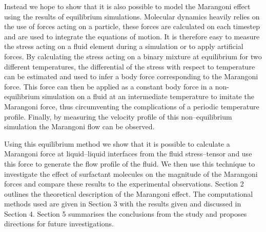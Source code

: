 Instead we hope to show that it is also possible to model the Marangoni effect using the results of equilibrium simulations. 
Molecular dynamics heavily relies on the use of forces acting on a particle, these forces are calculated on each timestep and are used to integrate the equations of motion.
It is therefore easy to measure the stress acting on a fluid element during a simulation or to apply artificial forces.
By calculating the stress acting on a binary mixture at equilibrium for two different temperatures, the differential of the stress with respect to temperature can be estimated and used to infer a body force corresponding to the Marangoni force.
This force can then be applied as a constant body force in a non-equilibrium simulation on a fluid at an intermediate temperature to imitate the Marangoni force, thus circumventing the complications of a periodic temperature profile.
Finally, by measuring the velocity profile of this non--equilibrium simulation the Marangoni flow can be observed.

Using this equilibrium method we show that it is possible to calculate a Marangoni force at liquid--liquid interfaces from the fluid stress--tensor and use this force to generate the flow profile of the fluid.
We then use this technique to investigate the effect of surfactant molecules on the magnitude of the Marangoni forces and compare these results to the experimental observations.
Section 2 outlines the theoretical description of the Marangoni effect.
The computational methods used are given in Section 3 with the results given and discussed in Section 4.
Section 5 summarises the conclusions from the study and proposes directions for future investigations.
